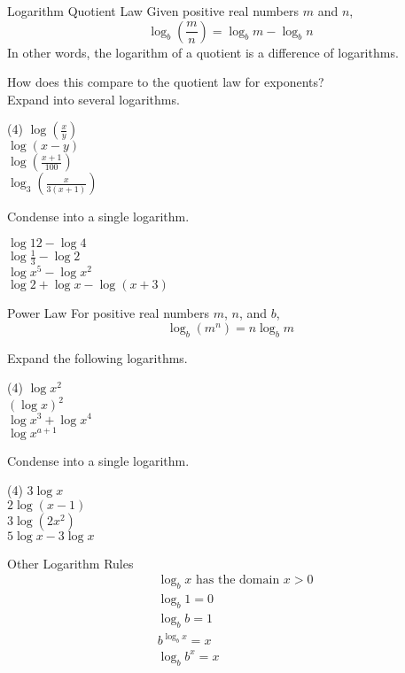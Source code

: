 \documentclass[12pt,fleqn]{book}
\begin{document}
\begin{thm}{Logarithm Quotient Law}{}
    Given positive real numbers $m$ and $n$,
    \[
\log _b\left(\frac{m}{n}\right)=\log _b m-\log _b n
\]
In other words, the logarithm of a quotient is a difference of logarithms.
\end{thm}
How does this compare to the quotient law for exponents?
\\[1in]
Expand into several logarithms.
\begin{tasks}(4)
\task $\log \left(\frac{x}{y}\right)$
\\[1in]
\task $\log (x-y)$
\\[1in]
\task $\log \left(\frac{x+1}{100}\right)$
\\[1in]
\task $\log _3\left(\frac{x}{3(x+1)}\right)$
\\[1in]
\end{tasks}
Condense into a single logarithm.
\begin{tasks}{}
\task $\log 12-\log 4$
\\[1in]
\task $\log \frac{1}{3}-\log 2$
\\[1in]
\task $\log x^5-\log x^2$
\\[1in]
\task $\log 2+\log x-\log (x+3)$
\\[1in]
\end{tasks}
\begin{thm}{Power Law}{}
    For positive real numbers $m$, $n$, and $b$,
\[
\log _b\left(m^n\right)=n \log _b m
\]
\end{thm}
Expand the following logarithms.
\begin{tasks}(4)
\task $\log x^2$
\\[1in]
\task $(\log x)^2$
\\[1in]
\task $\log x^3+\log x^4$
\\[1in]
\task $\log x^{a+1}$
\\[1in]
\end{tasks}
Condense into a single logarithm.
\begin{tasks}(4)
\task $3 \log x$
\\[1in]
\task $2 \log (x-1)$
\\[1in]
\task $3 \log \left(2 x^2\right)$
\\[1in]
\task $5 \log x-3 \log x$
\\[1in]
\end{tasks}
\begin{thm}{Other Logarithm Rules}{}
    \begin{align*}
& \log _b x \text { has the domain } x>0 \\
& \log _b 1=0 \\
& \log _b b=1 \\
& b^{\log _b x}=x \\
& \log _b b^x=x
\end{align*}
\end{thm}
\end{document}
